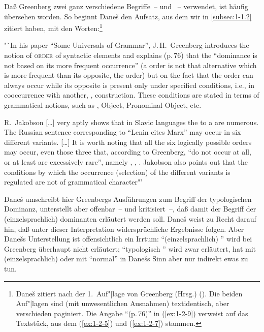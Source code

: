 \documentclass[output=paper]{langsci/langscibook}
\begin{document}
Daß Greenberg zwei ganz verschiedene Begriffe~– 
und ~– verwendet, ist häufig übersehen worden. So beginnt
Dane\v{s} den Aufsatz, aus dem wir in \ref{subsec:1-1.2} zitiert haben, mit den Worten:\footnote{%
  Dane\v{s} zitiert nach der 1.~Auf"|lage von Greenberg (Hrsg.) (\citeyear{Universalsoflanguage}). Die
  beiden Auf"|lagen sind (mit unwesentlichen Ausnahmen) textidentisch, aber verschieden paginiert. Die
  Angabe "`(p.\,76)"' in (\ref{ex:1-2-9}) verweist auf das Textstück, aus dem (\ref{ex:1-2-5}) und
  (\ref{ex:1-2-7}) stammen.%
}
\begin{exe}
\ex\label{ex:1-2-9}
"`In his paper ``Some Universals of Grammar'', J.\,H.\ Greenberg introduces
the notion of \textsc{ order} of syntactic elements and explains (p.\,76) that the ``dominance is not based on its more frequent occurrence'' (a  order is not that alternative which is more frequent than its opposite,
the  order) but on the fact that the  order can always occur while its opposite is present only under specified conditions, i.e., in cooccurrence with another, , construction. These conditions are
stated in terms of grammatical notions, such as , Object, Pronominal
Object, etc.

\hspace{1em} R.\ Jakobson [\ldots] very aptly shows that in Slavic languages the
 to a  are
numerous. The Russian sentence corresponding to ``Lenin cites Marx'' may
occur in six different variants. [\ldots] It is worth noting that all the
six logically possible orders may occur, even those three that,
according to Greenberg, ``do not occur at all, or at least are
excessively rare'', namely , , . Jakobson also points out that
the conditions by which the occurrence (selection) of the different
variants is regulated are not of grammatical character"' \citep[499]{Danes1967}
\end{exe}
Dane\v{s} umschreibt hier Greenbergs Ausführungen zum Begriff der
typologischen Dominanz, unterstellt aber offenbar~-- und kritisiert~–,
daß damit der Begriff der (einzelsprachlich) dominanten 
erläutert werden soll. Dane\v{s} weist zu Recht darauf hin, daß unter
dieser Interpretation widersprüchliche Ergebnisse folgen. Aber
Dane\v{s}s Unterstellung ist offensichtlich ein Irrtum:
"`(einzelsprachlich) "' wird bei Greenberg überhaupt nicht
erläutert; "`typologisch "' wird zwar erläutert, hat mit
(einzelsprachlich)  oder mit "`normal"' in Dane\v{s}s Sinn aber
nur indirekt ewas zu tun.
\end{document}

